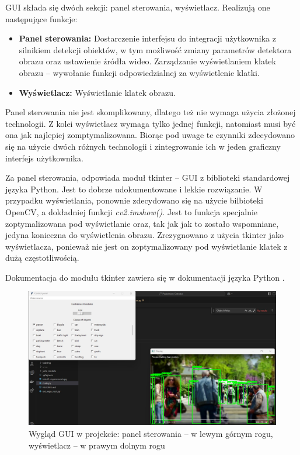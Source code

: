 GUI składa się dwóch sekcji: panel sterowania, wyświetlacz. Realizują one następujące funkcje:
\begin{itemize}
    \item \textbf{Panel sterowania:} Dostarczenie interfejsu do integracji użytkownika z silnikiem detekcji obiektów, w tym możliwość zmiany parametrów detektora obrazu oraz ustawienie źródła wideo. Zarządzanie wyświetlaniem klatek obrazu -- wywołanie funkcji odpowiedzialnej za wyświetlenie klatki.
    \item \textbf{Wyświetlacz: } Wyświetlanie klatek obrazu.
\end{itemize}

Panel sterowania nie jest skomplikowany, dlatego też nie wymaga użycia złożonej technologii. Z kolei wyświetlacz wymaga tylko jednej funkcji, natomiast musi być ona jak najlepiej zomptymalizowana. Biorąc pod uwage te czynniki zdecydowano się na użycie dwóch różnych technologii i zintegrowanie ich w jeden graficzny interfejs użytkownika.

Za panel sterowania, odpowiada moduł tkinter -- GUI z biblioteki standardowej języka Python. Jest to dobrze udokumentowane i lekkie rozwiązanie. W przypadku wyświetlania, ponownie zdecydowano się na użycie bilbioteki OpenCV, a dokładniej funkcji \emph{cv2.imshow()}. Jest to funkcja specjalnie zoptymalizowana pod wyświetlanie oraz, tak jak jak to zostało wspomniane, jedyna konieczna do wyświetlenia obrazu.
Zrezygnowano z użycia tkinter jako wyświetlacza, ponieważ nie jest on zoptymalizowany pod wyświetlanie klatek z dużą częstotliwością. 

Dokumentacja do modułu tkinter zawiera się w dokumentacji języka Python \cite{Python_docs}.

\begin{figure}[H]
    \centering
    \includegraphics[width=\linewidth]{r_technologie/GUI_assets/mockup.jpg}
    \caption{Wygląd GUI w projekcie: panel sterowania -- w lewym górnym rogu, wyświetlacz -- w prawym dolnym rogu}
    \label{fig:technologies-GUI}
\end{figure}